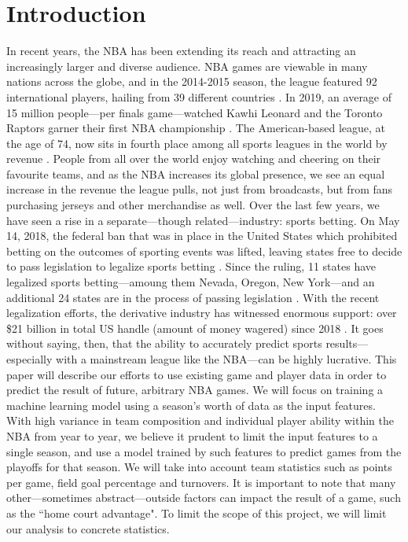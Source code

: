 \documentclass[letterpaper]{article} %
\begin{document}
\section{Introduction}
In recent years, the NBA has been extending its reach and attracting an increasingly larger and diverse audience. NBA games are viewable in many nations across the globe, and in the 2014-2015 season, the league featured 92 international players, hailing from 39 different countries \cite{jones2016predicting}. In 2019, an average of 15 million people---per finals game---watched Kawhi Leonard and the Toronto Raptors garner their first NBA championship \cite{gough_2019}. The American-based league, at the age of 74, now sits in fourth place among all sports leagues in the world by revenue \cite{amoros_2016}. People from all over the world enjoy watching and cheering on their favourite teams, and as the NBA increases its global presence, we see an equal increase in the revenue the league pulls, not just from broadcasts, but from fans purchasing jerseys and other merchandise as well. Over the last few years, we have seen a rise in a separate---though related---industry: sports betting. On May 14, 2018, the federal ban that was in place in the United States which prohibited betting on the outcomes of sporting events was lifted, leaving states free to decide to pass legislation to legalize sports betting \cite{licata_2019}. Since the ruling, 11 states have legalized sports betting---amoung them Nevada, Oregon, New York---and an additional 24 states are in the process of passing legislation \cite{licata_2019}. With the recent legalization efforts, the derivative industry has witnessed enormous support: over \$21 billion in total US handle (amount of money wagered) since 2018 \cite{legal_sports_report}. It goes without saying, then, that the ability to accurately predict sports results---especially with a mainstream league like the NBA---can be highly lucrative. This paper will describe our efforts to use existing game and player data in order to predict the result of future, arbitrary NBA games. We will focus on training a machine learning model using a season's worth of data as the input features. With high variance in team composition and individual player ability within the NBA from year to year, we believe it prudent to limit the input features to a single season, and use a model trained by such features to predict games from the playoffs for that season. We will take into account team statistics such as points per game, field goal percentage and turnovers. It is important to note that many other---sometimes abstract---outside factors can impact the result of a game, such as the ``home court advantage". To limit the scope of this project, we will limit our analysis to concrete statistics. \\
\end{document}
